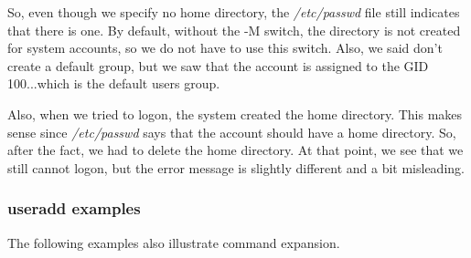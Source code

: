 So, even though we specify no home directory, the \textsl{/etc/passwd} file still indicates that there is one. By default, without the -M switch, the directory is not created for system accounts, so we do not have to use this switch. Also, we said don't create a default group, but we saw that the account is assigned to the GID 100...which is the default users group.

Also, when we tried to logon, the system created the home directory. This makes sense since \textsl{/etc/passwd} says that the account should have a home directory. So, after the fact, we had to delete the home directory. At that point, we see that we still cannot logon, but the error message is slightly different and a bit misleading.

\subsubsection{useradd examples}

The following examples also illustrate command expansion.


